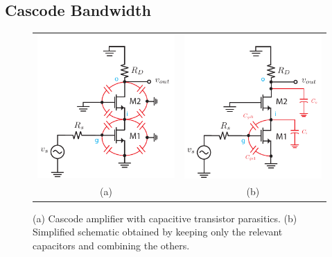\subsection{Cascode Bandwidth}
\begin{figure}[tb]
\begin{center}
\begin{tabular}{cc}
\includegraphics[scale=1]{12cascode_caps} &
\includegraphics[scale=1]{13cascode_caps_simple} \\
(a) & (b) \\
\end{tabular}
\end{center}
\caption{(a) Cascode amplifier with capacitive transistor parasitics.  (b) Simplified schematic obtained by keeping only the relevant capacitors and combining the others.}
\label{fig:12cascode_caps}
\end{figure}

